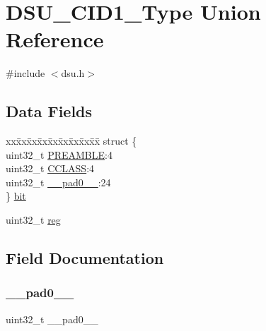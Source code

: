 \hypertarget{union_d_s_u___c_i_d1___type}{}\section{D\+S\+U\+\_\+\+C\+I\+D1\+\_\+\+Type Union Reference}
\label{union_d_s_u___c_i_d1___type}


{\ttfamily \#include $<$dsu.\+h$>$}

\subsection*{Data Fields}
\begin{DoxyCompactItemize}
\item 
\begin{tabbing}
xx\=xx\=xx\=xx\=xx\=xx\=xx\=xx\=xx\=\kill
struct \{\\
\>uint32\_t \mbox{\hyperlink{union_d_s_u___c_i_d1___type_a893904fe60cf02df2807ebb258b67857}{PREAMBLE}}:4\\
\>uint32\_t \mbox{\hyperlink{union_d_s_u___c_i_d1___type_a0f282950c422fa65010971d88a119b3d}{CCLASS}}:4\\
\>uint32\_t \mbox{\hyperlink{union_d_s_u___c_i_d1___type_a3e57c2ef1c3ffb36722f000cc1156824}{\_\_pad0\_\_}}:24\\
\} \mbox{\hyperlink{union_d_s_u___c_i_d1___type_a9add182fe818ea788adf01c6647c6e4b}{bit}}\\

\end{tabbing}\item 
uint32\+\_\+t \mbox{\hyperlink{union_d_s_u___c_i_d1___type_a6b91636401516a477989a336376d7b40}{reg}}
\end{DoxyCompactItemize}


\subsection{Field Documentation}
\mbox{\label{union_d_s_u___c_i_d1___type_a3e57c2ef1c3ffb36722f000cc1156824}} 
\subsubsection{\texorpdfstring{\_\_pad0\_\_}{\_\_pad0\_\_}}
{\footnotesize\ttfamily uint32\+\_\+t \+\_\+\+\_\+pad0\+\_\+\+\_\+}

